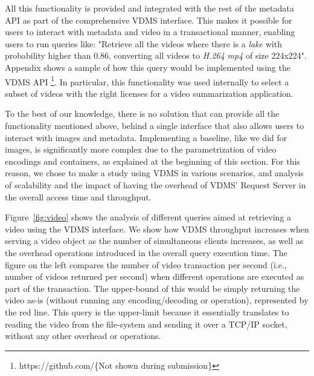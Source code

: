 All this functionality is provided and integrated with the rest of the
metadata API as part of the comprehensive VDMS interface.
This makes it possible for users to interact with metadata and video in 
a transactional manner, enabling users to run queries like: 
"Retrieve all the videos where there is a \textit{lake} with 
probability higher than 0.86, converting all videos to \textit{H.264} 
\textit{mp4} of size 224x224".
Appendix shows a sample of how this query would be implemented using the VDMS API
\footnote{https://github.com/\{Not shown during submission\}}.
In particular, this functionality was used internally to select a subset
of videos with the right licenses for a video summarization application.

To the best of our knowledge, there is no solution that can provide
all the functionality mentioned above, behind a single interface
that also allows users to interact with images and metadata.
Implementing a baseline, like we did for images, is significantly more complex
due to the parametrization of video encodings and containers, 
as explained at the beginning of this section.
For this reason, we chose to make a study using VDMS in various scenarios,
and analysis of scalability and the impact of having the overhead of VDMS' Request
Server in the overall access time and throughput.

Figure~\ref{fig:video} shows the analysis of different queries aimed
at retrieving a video using the VDMS interface.
We show how VDMS throughput increases when serving
a video object as the number of simultaneous clients increases, as well as the
overhead operations introduced in the overall query execution time.
The figure on the left compares the number of video transaction per second
(i.e., number of videos returned per second) when different operations
are executed as part of the transaction. The upper-bound of this would be
simply returning the video as-is (without running any encoding/decoding or
operation), represented by the red line. This query is the upper-limit because
it essentially translates to reading the video from the file-system and sending
it over a TCP/IP socket, without any other overhead or operations.

